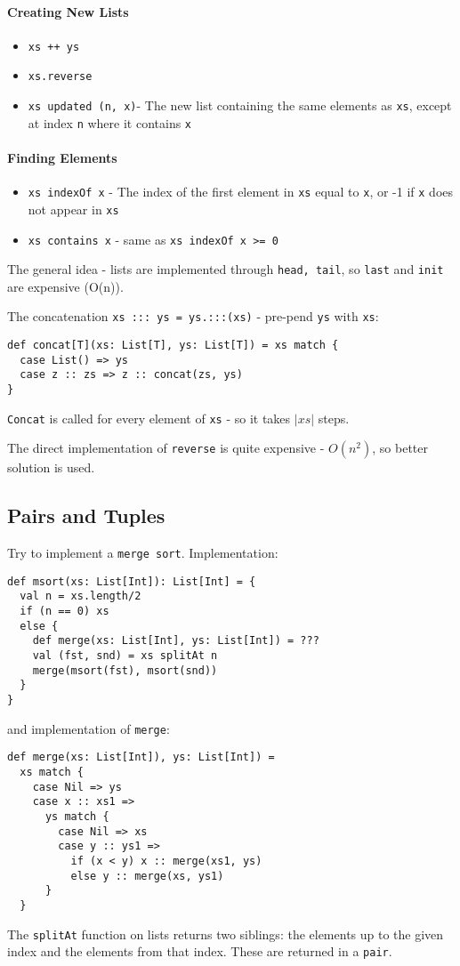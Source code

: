 \documentclass{scrartcl}
\newcommand{\term}[1]{\verb~#1~} %
\begin{document}
\paragraph{Creating New Lists}
\begin{itemize}
\item \lstinline|xs ++ ys|
\item \lstinline|xs.reverse|
\item \lstinline|xs updated (n, x)|- The new list containing the same elements
  as \lstinline|xs|, except at index \lstinline|n| where it contains
  \lstinline|x|
\end{itemize}

\paragraph{Finding Elements}
\begin{itemize}
\item \lstinline|xs indexOf x| - The index of the first element in
  \lstinline|xs| equal to \lstinline|x|, or -1 if \lstinline|x| does not appear
  in \lstinline|xs|
\item \lstinline|xs contains x| - same as \lstinline|xs indexOf x >= 0|
\end{itemize}

The general idea - lists are implemented through \lstinline|head, tail|, so
\lstinline|last| and \lstinline|init| are expensive (O(n)).

The concatenation \lstinline|xs ::: ys = ys.:::(xs)| - pre-pend \lstinline|ys|
with \lstinline|xs|:
\begin{lstlisting}
def concat[T](xs: List[T], ys: List[T]) = xs match {
  case List() => ys
  case z :: zs => z :: concat(zs, ys)
}
\end{lstlisting}
\lstinline|Concat| is called for every element of \lstinline|xs| - so it takes
$|xs|$ steps.

The direct implementation of \lstinline|reverse| is quite expensive - $O(n^2)$,
so better solution is used.

\subsection{Pairs and Tuples}
\label{sec:PairsAndTuples}

Try to implement a \term{merge sort}. Implementation:
\begin{lstlisting}
def msort(xs: List[Int]): List[Int] = {
  val n = xs.length/2
  if (n == 0) xs
  else {
    def merge(xs: List[Int], ys: List[Int]) = ???
    val (fst, snd) = xs splitAt n
    merge(msort(fst), msort(snd))
  }
}
\end{lstlisting}
and implementation of \lstinline|merge|:
\begin{lstlisting}
def merge(xs: List[Int]), ys: List[Int]) =
  xs match {
    case Nil => ys
    case x :: xs1 =>
      ys match {
        case Nil => xs
        case y :: ys1 =>
          if (x < y) x :: merge(xs1, ys)
          else y :: merge(xs, ys1)
      }
  }
\end{lstlisting}
The \lstinline|splitAt| function on lists returns two siblings: the elements up
to the given index and the elements from that index. These are returned in a
\term{pair}.
\end{document}

